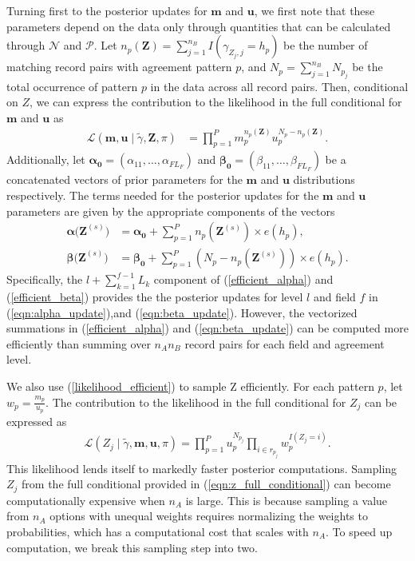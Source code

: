 \documentclass[ba]{imsart}
\begin{document}
Turning first to the posterior updates for $\bm{m}$ and $\bm{u}$, we first note that these parameters depend on the data only through quantities that can be calculated through $\mathcal{N}$ and $\mathcal{P}$. Let $n_p(\bm{Z}) = \sum_{j=1}^{n_B} I\left(\gamma_{Z_j, j} = h_p \right)$ be the number of matching record pairs with agreement pattern $p$, and $N_p = \sum_{j=1}^{n_B} N_{p_j}$ be the total occurrence of pattern $p$ in the data across all record pairs. Then, conditional on $Z$, we can express the contribution to the likelihood in the full conditional for $\bm{m}$ and $\bm{u}$ as
\begin{align}
	\mathcal{L}(\bm{m}, \bm{u} \mid \tilde{\gamma}, \bm{Z}, \pi)  &=  \prod_{p=1}^P m_p^{n_p(\bm{Z})}u_p^{N_p - n_p(\bm{Z})}  \label{likelihood_efficient_m_u}.
\end{align}
Additionally, let $\bm{\alpha_0} = (\alpha_{11}, \ldots, \alpha_{F L_F})$ and $\bm{\beta_0}= (\beta_{11}, \ldots, \beta_{F L_F})$ be a concatenated vectors of prior parameters for the $\bm{m}$ and $\bm{u}$ distributions respectively. The terms needed for the posterior updates for the $\bm{m}$ and $\bm{u}$ parameters are given by the appropriate components of the vectors
\begin{subequations}
	\begin{align}
		\bm{\alpha(Z}^{(s)}\bm{)} &= \bm{\alpha_0} + \sum_{p=1}^P n_p\left(\bm{Z}^{(s)}\right) \times e(h_p), \label{efficient_alpha} \\
		\bm{\beta(Z}^{(s)}\bm{)} &= \bm{\beta_0} + \sum_{p=1}^P \left(N_p - n_p\left(\bm{Z}^{(s)}\right)\right) \times e(h_p). \label{efficient_beta}
	\end{align}
\end{subequations}
Specifically, the $l + \sum_{k=1}^{f-1} L_k$ component of (\ref{efficient_alpha}) and (\ref{efficient_beta}) provides the the posterior updates for level $l$ and field $f$ in (\ref{eqn:alpha_update}),and (\ref{eqn:beta_update}). However, the vectorized summations in (\ref{efficient_alpha}) and (\ref{eqn:beta_update}) can be computed more efficiently than summing over $n_A n_B$ record pairs for each field and agreement level.

We also use (\ref{likelihood_efficient}) to sample Z efficiently. For each pattern $p$, let $w_p =\frac{m_p}{u_p}$.  The contribution to the likelihood in the full conditional for $Z_j$ can be expressed as
\begin{align}
	\mathcal{L}(Z_j\mid  \tilde{\gamma}, \bm{m}, \bm{u}, \pi) = \prod_{p=1}^P u_p^{N_{p_j}} \prod_{i \in r_{p_j}} w_p^{I(Z_j = i)}. \label{likelihood_efficient_z}
\end{align}
This likelihood lends itself to markedly faster posterior computations. Sampling $Z_j$ from the full conditional provided in (\ref{eqn:z_full_conditional}) can become computationally expensive when $n_A$ is large. This is because sampling a value from $n_A$ options with unequal weights requires normalizing the weights to probabilities, which has a computational cost that scales with $n_A$. To speed up computation, we break this sampling step into two. 
\end{document}
